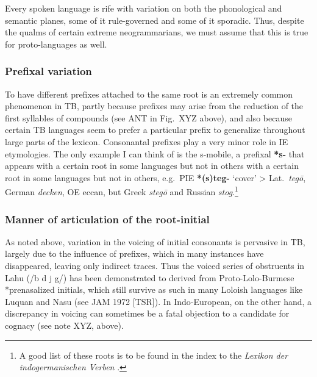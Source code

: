 Every spoken language is rife with variation on both the phonological and semantic planes, some of it rule-governed and some of it sporadic. Thus, despite the qualms of certain extreme neogrammarians, we must assume that this is true for proto-languages as well.

\subsubsection{Prefixal variation}

To have different prefixes attached to the same root is an extremely common phenomenon in TB, 
partly because prefixes may arise from the reduction of the first syllables of compounds (see ANT in Fig.~XYZ above), and also because certain TB languages seem to prefer a particular prefix to generalize throughout large parts of the lexicon.  Consonantal prefixes play a very minor role in IE etymologies. The only example I can think of is the s-mobile, a prefixal \textbf{*s-} that appears with a certain root in some languages but not in others with a certain root in some languages but not in others, e.g.\ PIE \textbf{*(s)teg-} ‘cover’ > Lat.\ \textit{tegō}, German \textit{decken}, OE {{\th}eccan}, but Greek \textit{stegō} and Russian \textit{stog}.\footnote{A good list of these roots is to be found in the index to the \textit{Lexikon der indogermanischen Verben} \citep{Rixetal2001}.}

\subsubsection{Manner of articulation of the root-initial}

As noted above, variation in the voicing of initial consonants is pervasive in TB, largely due to the influence of prefixes, which in many instances have disappeared, leaving only indirect traces. Thus the voiced series of obstruents in Lahu (/b d j g/) has been demonstrated to derived from Proto-Lolo-Burmese *prenasalized initials, which still survive as such in many Loloish languages like Luquan and Nasu (see JAM 1972 [TSR]).
In Indo-European, on the other hand, a discrepancy in voicing can sometimes be a fatal objection to a candidate for cognacy (see note XYZ, above).



